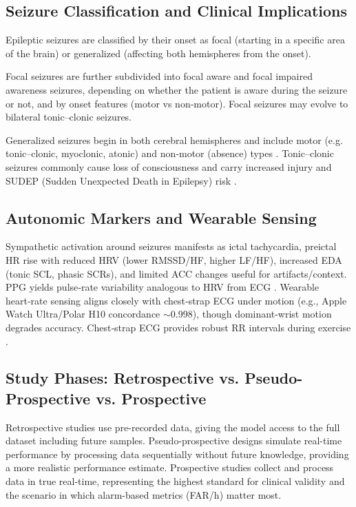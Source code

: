 \subsection{Seizure Classification and Clinical Implications}

Epileptic seizures are classified by their onset as focal (starting in a specific area of the brain)
or generalized (affecting both hemispheres from the onset).

Focal seizures are further subdivided into focal aware and focal impaired awareness seizures,
depending on whether the patient is aware during the seizure or not, and by onset features (motor vs non‑motor).
Focal seizures may evolve to bilateral tonic–clonic seizures.

Generalized seizures begin in both cerebral hemispheres and include motor
(e.g. tonic–clonic, myoclonic, atonic) and non‑motor (absence) types
\parencite{fisherInstructionManualILAE2017}. 
Tonic–clonic seizures commonly cause loss of consciousness and carry increased
injury and SUDEP (Sudden Unexpected Death in Epilepsy) risk \parencite{hesdorfferCombinedAnalysisRisk2011}.

\subsection{Autonomic Markers and Wearable Sensing}
Sympathetic activation around seizures manifests as ictal tachycardia,
preictal HR rise with reduced HRV (lower RMSSD/HF, higher LF/HF),
increased EDA (tonic SCL, phasic SCRs), and limited ACC changes
useful for artifacts/context. 
PPG yields pulse‑rate variability analogous to HRV from ECG
\parencite{mironAutonomicBiosignalsSeizure2025,masonHeartRateVariability2024}. 
Wearable heart‑rate sensing aligns closely with chest‑strap ECG under motion (e.g., Apple Watch
Ultra/Polar H10 concordance $\sim$0.998), though dominant‑wrist
motion degrades accuracy. Chest‑strap ECG provides robust RR intervals
during exercise \parencite{wolfHearttoWearAssessingAccuracy2024a}.

\subsection{Study Phases: Retrospective vs. Pseudo-Prospective vs. Prospective}
Retrospective studies use pre-recorded data, giving the model access to the full dataset including future samples. 
Pseudo-prospective designs simulate real-time performance by processing data sequentially without future knowledge, 
providing a more realistic performance estimate. Prospective studies collect and 
process data in true real-time, representing the highest standard for clinical validity and 
the scenario in which alarm-based metrics (FAR/h) matter most.

